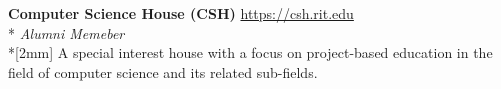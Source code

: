 \documentclass[a4paper,margin,line]{resume}
\newcommand{\rvspace}{2mm} %
\newcommand{\rurl}[1]{\hfill {\footnotesize \url{#1}}}
\newcommand{\rdescription}[1]{\small #1 \normalsize}
\newcommand{\rorganization}[4] {
    \item{\bf #1}                           %
    \rurl{#2} \\*                           %
    \hfill {\small \emph{#3}} \\*[\rvspace] %
    \rdescription{#4}                       %
}
\begin{document}
\begin{resume}
\begin{asparablank}
        \rorganization {Computer Science House ({\small CSH})}
                       {https://csh.rit.edu}
                       {Alumni Memeber}
        {
            A special interest house with a focus on project-based education in
            the field of computer science and its related sub-fields.
        }
    \end{asparablank}
\end{resume}
\end{document}
